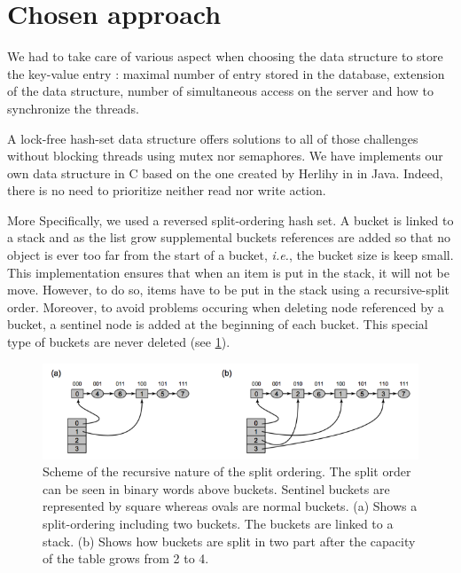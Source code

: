 \documentclass[a4paper,11pt]{report}
\begin{document}
    \section*{Chosen approach}

    We had to take care of various aspect when choosing the data structure to
    store the key-value entry : maximal number of entry stored in the database,
    extension of the data structure, number of simultaneous access on the server and
    how to synchronize the threads.

    A lock-free hash-set data structure offers solutions to all of those challenges without blocking threads using mutex
    nor semaphores. We have implements our own data structure in C based on the one created by Herlihy in
    \cite{Herlihy2006} in Java. Indeed, there is no need to prioritize neither read nor write action.

    More Specifically, we used a reversed split-ordering hash set.
    A bucket is linked to a stack and as the list grow supplemental buckets references are added so that
    no object is ever too far from the start of a bucket, \textit{i.e.}, the bucket size is keep small.
    This implementation ensures that when an item is put in the stack, it will not be move.
    However, to do so, items have to be put in the stack using a recursive-split order.
    Moreover, to avoid problems occuring when deleting node referenced by a bucket, a sentinel node is added
    at the beginning of each bucket. This special type of buckets are never deleted (see \ref{fig:Fig1}).

    \begin{figure}[h]
        \centering
            \includegraphics{images/hashsetFig1.png}
        \caption{Scheme of the recursive nature of the split ordering.
        The split order can be seen in binary words above buckets.
        Sentinel buckets are represented by square whereas ovals are normal buckets.
        (a) Shows a split-ordering including two buckets. The buckets are linked to a stack.
        (b) Shows how buckets are split in two part after the capacity of the table grows from 2 to 4.}
        \label{fig:Fig1}
    \end{figure}
\end{document}
